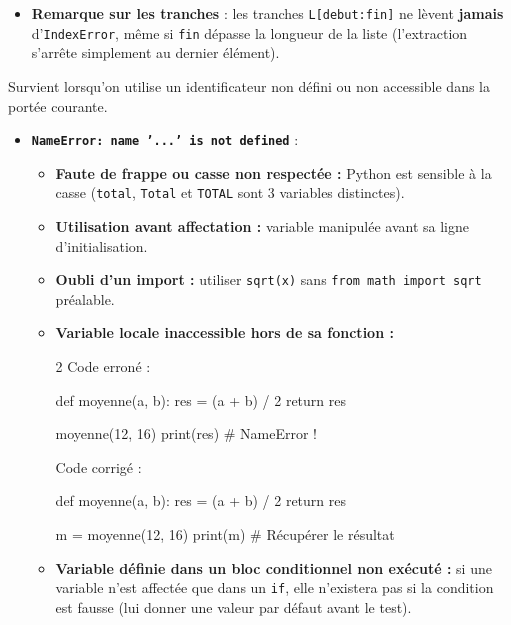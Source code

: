 \documentclass[11pt,a4paper]{article}
\begin{document}
\begin{tcolorbox}[left=0cm,title=\bf{\faBug \; 4. Erreurs d'indice (IndexError)},colbacktitle=cfond]
\begin{itemize}
	\item[\textbullet] \textbf{Remarque sur les tranches} : les tranches \texttt{L[debut:fin]} ne lèvent \textbf{jamais} d'\texttt{IndexError}, même si \texttt{fin} dépasse la longueur de la liste (l'extraction s'arrête simplement au dernier élément).
\end{itemize}
\end{tcolorbox}

\begin{tcolorbox}[left=0cm,title=\bf{\faBug \; 5. Erreurs de nom et portée (NameError, UnboundLocalError)},colbacktitle=cfond]
Survient lorsqu'on utilise un identificateur non défini ou non accessible dans la portée courante.
\begin{itemize}
	\item[\textbullet] \textbf{\texttt{NameError: name '...' is not defined}} :
	\begin{itemize}
		\item[\ding{226}] \textbf{Faute de frappe ou casse non respectée :} Python est sensible à la casse (\texttt{total}, \texttt{Total} et \texttt{TOTAL} sont 3 variables distinctes).
		\item[\ding{226}] \textbf{Utilisation avant affectation :} variable manipulée avant sa ligne d'initialisation.
		\item[\ding{226}] \textbf{Oubli d'un import :} utiliser \texttt{sqrt(x)} sans \texttt{from math import sqrt} préalable.
		\item[\ding{226}] \textbf{Variable locale inaccessible hors de sa fonction :}
		\setlength{\multicolsep}{0pt}
		\begin{multicols}{2}
			\textcolor{BrickRed}{\faTimesCircle \; Code erroné :}
			\begin{python}
def moyenne(a, b):
    res = (a + b) / 2
    return res

moyenne(12, 16)
print(res) # NameError !
			\end{python}
			\textcolor{OliveGreen}{\faCheckCircle \; Code corrigé :}
			\begin{python}
def moyenne(a, b):
    res = (a + b) / 2
    return res

m = moyenne(12, 16)
print(m) # Récupérer le résultat
			\end{python}
		\end{multicols}
		\item[\ding{226}] \textbf{Variable définie dans un bloc conditionnel non exécuté :} si une variable n'est affectée que dans un \texttt{if}, elle n'existera pas si la condition est fausse (lui donner une valeur par défaut avant le test).
	\end{itemize}


\end{itemize}
\end{tcolorbox}
\end{document}
